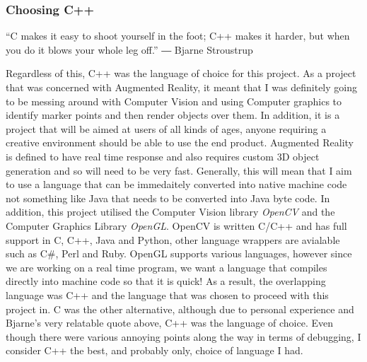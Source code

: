 \documentclass[11pt]{article}
\begin{document}
\subsubsection{Choosing C++}
\begin{center}
“C makes it easy to shoot yourself in the foot; C++ makes it harder, but when you do it blows your whole leg off.”
― Bjarne Stroustrup
\end{center}

Regardless of this, C++ was the language of choice for this project.
As a project that was concerned with Augmented Reality, it meant that I was
definitely going to be messing around with Computer Vision and using 
Computer graphics to identify marker points and then render objects over them.
In addition, it is a project that will be aimed at users of all kinds of ages,
anyone requiring a creative environment should be able to use the end product.
Augmented Reality is defined to have real time response and also requires custom 3D 
object generation and so will need to be very fast. Generally, this will mean
that I aim to use a language that can be immedaitely converted into native
machine code not something like Java that needs to be converted into Java byte code.
In addition, this project utilised the Computer Vision library
\textit{OpenCV} and the Computer Graphics Library \textit{OpenGL}. OpenCV is written 
C/C++ and has full support in C, C++, Java and Python, other language wrappers are
avialable such as C\#, Perl and Ruby. OpenGL supports various languages, however
since we are working on a real time program, we want a language that compiles
directly into machine code so that it is quick! As a result, the overlapping
language was C++ and the language that was chosen to proceed with this project in.
C was the other alternative, although due to personal experience and Bjarne's
very relatable quote above, C++ was the language of choice. Even though there
were various annoying points along the way in terms of debugging, I consider
C++ the best, and probably only, choice of language I had.
\end{document}
